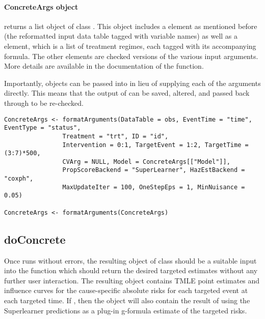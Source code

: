 \documentclass{report}
\newcommand{\1}{\ensuremath{\mathbf{1}}}
\begin{document}
\paragraph{ConcreteArgs object}
\label{concreteargs}
 returns a list object of class . This object includes a  element as mentioned before (the reformatted input data table tagged with variable names) as well as a  element, which is a list of treatment regimes, each tagged with its accompanying  formula. The other elements are checked versions of the various input arguments. More details are available in the documentation of the  function.

Importantly,  objects can be passed into  in lieu of supplying each of the arguments directly. This means that the output of  can be saved, altered, and passed back through  to be re-checked.

\begin{lstlisting}
ConcreteArgs <- formatArguments(DataTable = obs, EventTime = "time", EventType = "status", 
				Treatment = "trt", ID = "id", 
				Intervention = 0:1, TargetEvent = 1:2, TargetTime = (3:7)*500, 
				CVArg = NULL, Model = ConcreteArgs[["Model"]], 
				PropScoreBackend = "SuperLearner", HazEstBackend = "coxph", 
				MaxUpdateIter = 100, OneStepEps = 1, MinNuisance = 0.05)

ConcreteArgs <- formatArguments(ConcreteArgs)
\end{lstlisting}

\subsection{doConcrete}
\label{doConcrete}
Once  runs without errors, the resulting object of class  should be a suitable input into the function  which should return the desired targeted estimates without any further user interaction. The resulting object contains TMLE point estimates and influence curves for the cause-specific absolute risks for each targeted event at each targeted time. If , then the object will also contain the result of using the Superlearner predictions as a plug-in g-formula estimate of the targeted risks.
\end{document}
